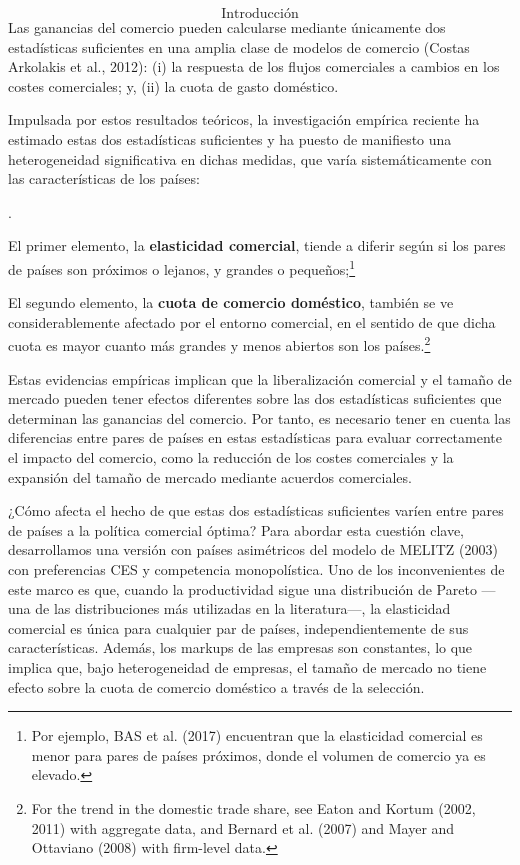\documentclass[10pt,a4paper]{article}
\newcounter{numitem}
\newenvironment{lnum}
      {\begin{list}{\arabic{numitem}.}{%
          \usecounter{numitem}%
          \setlength{\leftmargin}{1cm}%
          \setlength{\parskip}{3pt}%
          \setlength{\itemsep}{0pt}%
          \setlength{\parsep}{0pt}%
      }}
      {\end{list}}
\begin{document}
$$\text{Introducción}$$
Las ganancias del comercio pueden calcularse mediante únicamente dos estadísticas suficientes en una amplia clase de modelos de comercio (Costas Arkolakis et al., 2012): (i) la respuesta de los flujos comerciales a cambios en los costes comerciales; y, (ii) la cuota de gasto doméstico. 

Impulsada por estos resultados teóricos, la investigación empírica reciente ha estimado estas dos estadísticas suficientes y ha puesto de manifiesto una heterogeneidad significativa en dichas medidas, que varía sistemáticamente con las características de los países:
\begin{lnum}
    \item El primer elemento, la \textbf{elasticidad comercial}, tiende a diferir según si los pares de países son próximos o lejanos, y grandes o pequeños;\footnote{%
        Por ejemplo, BAS et al. (2017) encuentran que la elasticidad comercial es menor para pares de países próximos, donde el volumen de comercio ya es elevado.
    } 
    \item El segundo elemento, la \textbf{cuota de comercio doméstico}, también se ve considerablemente afectado por el entorno comercial, en el sentido de que dicha cuota es mayor cuanto más grandes y menos abiertos son los países.\footnote{%
        For the trend in the domestic trade share, see Eaton and Kortum (2002, 2011) with aggregate data, and Bernard et al. (2007) and Mayer and Ottaviano (2008) with firm-level data.
    } 
\end{lnum}

Estas evidencias empíricas implican que la liberalización comercial y el tamaño de mercado pueden tener efectos diferentes sobre las dos estadísticas suficientes que determinan las ganancias del comercio. Por tanto, es necesario tener en cuenta las diferencias entre pares de países en estas estadísticas para evaluar correctamente el impacto del comercio, como la reducción de los costes comerciales y la expansión del tamaño de mercado mediante acuerdos comerciales.


¿Cómo afecta el hecho de que estas dos estadísticas suficientes varíen entre pares de países a la política comercial óptima? Para abordar esta cuestión clave, desarrollamos una versión con países asimétricos del modelo de MELITZ (2003) con preferencias CES y competencia monopolística. Uno de los inconvenientes de este marco es que, cuando la productividad sigue una distribución de Pareto —una de las distribuciones más utilizadas en la literatura—, la elasticidad comercial es única para cualquier par de países, independientemente de sus características. Además, los markups de las empresas son constantes, lo que implica que, bajo heterogeneidad de empresas, el tamaño de mercado no tiene efecto sobre la cuota de comercio doméstico a través de la selección. 
\end{document}
